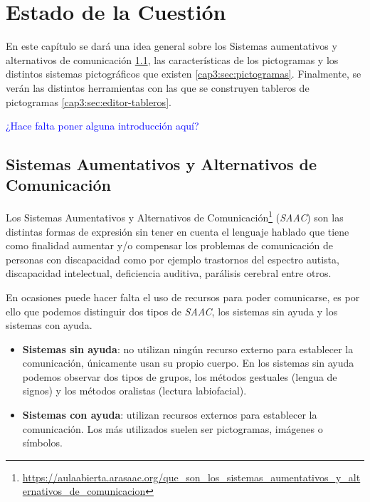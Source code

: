 \chapter{Estado de la Cuestión}
\label{cap:estadoDeLaCuestion}



\begin{resumen} En este capítulo se dará una idea general sobre los Sistemas aumentativos y alternativos de comunicación \ref{cap3:sec:saac}, las características de los pictogramas y los distintos sistemas pictográficos que existen \ref{cap3:sec:pictogramas}. Finalmente, se verán las distintos herramientas con las que se construyen tableros de pictogramas \ref{cap3:sec:editor-tableros}.

\end{resumen}

\textcolor{blue}{¿Hace falta poner alguna introducción aquí?}

\section{Sistemas Aumentativos y Alternativos de Comunicación}
\label{cap3:sec:saac}
Los Sistemas Aumentativos y Alternativos de Comunicación\footnote{\url{https://aulaabierta.arasaac.org/que_son_los_sistemas_aumentativos_y_alternativos_de_comunicacion}} (\textit{SAAC}) son las distintas formas de expresión sin tener en cuenta el lenguaje hablado que tiene como finalidad aumentar y/o compensar los problemas de comunicación de personas con discapacidad como por ejemplo trastornos del espectro autista, discapacidad intelectual, deficiencia auditiva, parálisis cerebral entre otros.

En ocasiones puede hacer falta el uso de recursos para poder comunicarse, es por ello que podemos distinguir dos tipos de \textit{SAAC}, los sistemas sin ayuda y los sistemas con ayuda.

\begin{itemize}
	\item \textbf{Sistemas sin ayuda}: no utilizan ningún recurso externo para establecer la comunicación, únicamente usan su propio cuerpo. En los sistemas sin ayuda podemos observar dos tipos de grupos, los métodos gestuales (lengua de signos) y los métodos oralistas (lectura labiofacial). 
	\item \textbf{Sistemas con ayuda}: utilizan recursos externos para establecer la comunicación. Los más utilizados suelen ser pictogramas, imágenes o símbolos.
\end{itemize}

